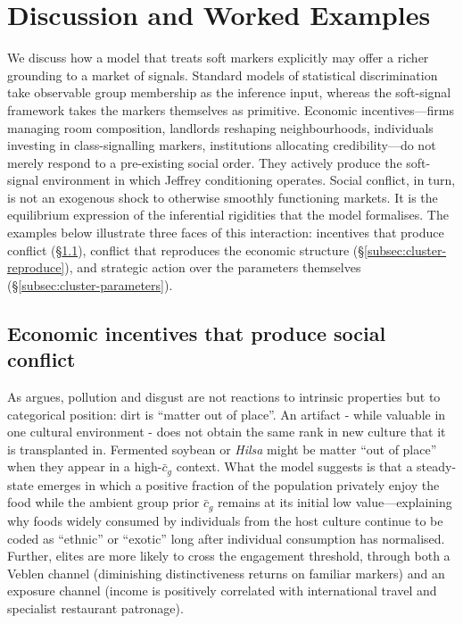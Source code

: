 \documentclass[12pt,a4paper]{article}
\theoremstyle{definition}
\numberwithin{proposition}{subsection}
\begin{document}
\section{Discussion and Worked Examples}
\label{sec:discussion}

We discuss how a model that treats soft markers explicitly may offer a richer grounding to a market of signals. Standard models of statistical discrimination take observable group
membership as the inference input, whereas the soft-signal framework
takes the markers themselves as primitive. Economic incentives---firms managing room composition,
landlords reshaping neighbourhoods, individuals investing in
class-signalling markers, institutions allocating credibility---do
not merely respond to a pre-existing social order. They actively
produce the soft-signal environment in which Jeffrey conditioning
operates. Social conflict, in turn, is not an exogenous shock to
otherwise smoothly functioning markets. It is the equilibrium
expression of the inferential rigidities that the model formalises.
The examples below illustrate three faces of this interaction:
incentives that produce conflict (\S\ref{subsec:cluster-produce}),
conflict that reproduces the economic structure
(\S\ref{subsec:cluster-reproduce}), and strategic action over the
parameters themselves (\S\ref{subsec:cluster-parameters}).


\subsection{Economic incentives that produce social conflict}
\label{subsec:cluster-produce}

As \citet{Douglas1966} argues, pollution and disgust are not reactions to intrinsic properties but to categorical position: dirt is ``matter out of place''. An artifact - while valuable in one cultural environment  - does not obtain the same rank in new culture that it is transplanted in. Fermented soybean or \emph{Hilsa} might be matter ``out of  place'' when they appear in a
high-$\bar{c}_g$ context. What the model suggests is that a steady-state emerges in which a positive
fraction of the population privately enjoy the food while the ambient
group prior $\bar{c}_g$ remains at its initial low value---explaining
why foods widely consumed by individuals from the host culture
continue to be coded as ``ethnic'' or ``exotic'' long after
individual consumption has normalised. Further, elites are more likely to
cross the engagement threshold, through both a Veblen channel
(diminishing distinctiveness returns on familiar markers) and an
exposure channel (income is positively correlated with international
travel and specialist restaurant patronage). 
\end{document}
